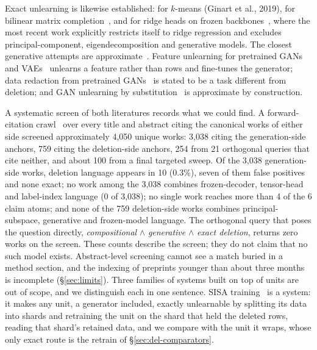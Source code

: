 \documentclass{article} %
\begin{document}
Exact unlearning is likewise established: for $k$-means (Ginart et al., 2019\nocite{ginart2019making}), for bilinear
matrix completion~\citep{xu2023netflix}, and for ridge heads on frozen backbones~\citep{quan2026exact}, where the most recent work
explicitly restricts itself to ridge regression and excludes principal-component,
eigendecomposition and generative models. The closest generative attempts are approximate~\citep{kong2022approximate}.
Feature unlearning for pretrained GANs and VAEs~\citep{moon2024feature} unlearns a feature rather than rows and
fine-tunes the generator; data redaction from pretrained GANs~\citep{kong2023data} is stated to be a task different
from deletion; and GAN unlearning by substitution~\citep{sun2025generative} is approximate by construction.

A systematic screen of both literatures records what we could find. A
forward-citation crawl~\citep{priem2022openalex} over every title and abstract citing the canonical works of either side
screened approximately 4,050 unique works: 3,038 citing the generation-side anchors, 759 citing
the deletion-side anchors, 254 from 21 orthogonal queries that cite neither, and about 100 from
a final targeted sweep. %
Of the 3,038 generation-side works, deletion language appears in 10 (0.3\%), seven of them
false positives and none exact; no work among the 3,038 combines frozen-decoder, tensor-head
and label-index language (0 of 3,038); no single work reaches more than 4 of the 6 claim atoms;
and none of the 759 deletion-side works combines principal-subspace, generative and
frozen-model language. %
The orthogonal query that poses the question directly, \emph{compositional} $\wedge$
\emph{generative} $\wedge$ \emph{exact deletion}, returns zero works on the screen.
These counts describe the screen; they do not claim that no such model exists. Abstract-level
screening cannot see a match buried in a method section, and the indexing of preprints younger
than about three months is incomplete (\S\ref{sec:limits}).
Three families of systems built on top of units are out of scope, and we distinguish each in one sentence.
SISA training~\citep{bourtoule2021machine} is a system: it makes any unit, a generator included,
exactly unlearnable by splitting its data into shards and retraining the unit on the shard that
held the deleted rows, reading that shard's retained data, and we compare with the unit it wraps,
whose only exact route is the retrain of \S\ref{sec:del-comparators}.
\end{document}

